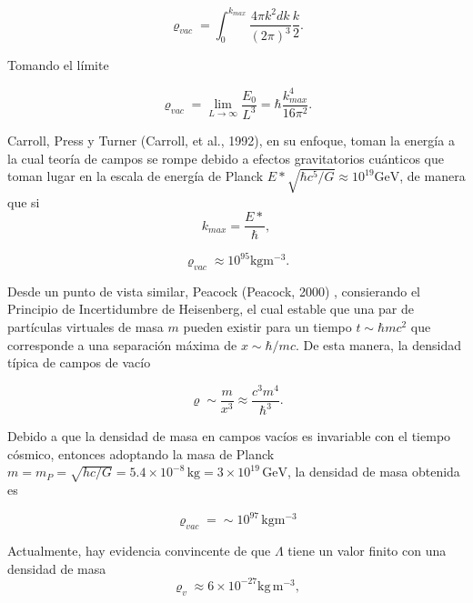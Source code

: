 \documentclass[11pt]{article}
\begin{document}
{  \begin{equation}
       \varrho_{vac} = \int_0^{k_{max}}{\frac{4\pi k^2 dk }{(2\pi)^3} \frac{k}{2}}.
  \end{equation}
  
  Tomando el límite
    
   \begin{equation}
       \varrho_{vac} = \lim_{L \to \infty}{\frac{E_0}{L^3}} = \hbar \frac{k^4_{max}}{16 \pi^2}.
   \end{equation}
    
    
    Carroll, Press y Turner (Carroll, et al., 1992), en su enfoque, toman la energía a la cual teoría de campos se rompe debido a efectos gravitatorios cuánticos que toman lugar en la escala de energía de Planck $E*\sqrt{\hbar c^5/G}  \approx 10^{19} \mathrm{GeV}$, de manera que si
    $$k_{max} = \frac{E*}{\hbar},$$
    
    \begin{equation}
        \varrho_{vac} \approx 10^{95} \mathrm{kg m^{-3}}.
    \end{equation}
    
    
    Desde un punto de vista similar, Peacock (Peacock, 2000) , consierando el Principio de Incertidumbre de Heisenberg, el cual estable que una par de partículas virtuales de masa $m$ pueden existir para un tiempo $t \sim \hbar mc^2$ que corresponde a una separación máxima de $x \sim \hbar/mc$. De esta manera, la densidad típica de campos de vacío 

    \begin{equation}
	    \varrho \sim \frac{m}{x^3} \approx \frac{c^3m^4}{\hbar^3}.
    \end{equation}
    
    Debido a que la densidad de masa en campos vacíos es invariable con el tiempo cósmico, entonces adoptando la masa de Planck $m = m_P = \sqrt{hc/G} = 5.4 \times 10^{-8} \, \mathrm{kg} = 3 \times 10^{19} \, \mathrm{GeV}$, la densidad de masa obtenida es

    \begin{equation}
        \varrho_{vac} = \sim 10^{97} \, \mathrm{kg m^{-3}}
    \end{equation} 
    
    Actualmente, hay evidencia convincente de que $\Lambda$ tiene un valor finito con una densidad de masa 
    \begin{equation}
        \varrho_v \approx 6 \times 10^{-27} \mathrm{kg \, m^{-3}},
    \end{equation} 

}
\end{document}
